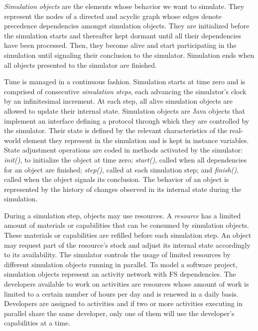 \documentclass[conference]{IEEEtran}
\begin{document}
{\it Simulation objects} are the elements whose behavior we want to simulate. They represent the nodes of a directed and acyclic graph whose edges denote precedence dependencies amongst simulation objects. They are initialized before the simulation starts and thereafter kept dormant until all their dependencies have been processed. Then, they become alive and start participating in the simulation until signaling their conclusion to the simulator. Simulation ends when all objects presented to the simulator are finished.

Time is managed in a continuous fashion. Simulation starts at time zero and is comprised of consecutive {\it simulation steps}, each advancing the simulator's clock by an infinitesimal increment. At each step, all alive simulation objects are allowed to update their internal state. Simulation objects are Java objects that implement an interface defining a protocol through which they are controlled by the simulator. Their state is defined by the relevant characteristics of the real-world element they represent in the simulation and is kept in instance variables. State adjustment operations are coded in methods activated by the simulator: {\it init()}, to initialize the object at time zero; {\it start()}, called when all dependencies for an object are finished; {\it step()}, called at each simulation step; and {\it finish()}, called when the object signals its conclusion. The behavior of an object is represented by the history of changes observed in its internal state during the simulation.

During a simulation step, objects may use resources. A {\it resource} has a limited amount of materials or capabilities that can be consumed by simulation objects. These materials or capabilities are refilled before each simulation step. An object may request part of the resource's stock and adjust its internal state accordingly to its availability. The simulator controls the usage of limited resources by different simulation objects running in parallel. To model a software project, simulation objects represent an activity network with FS dependencies. The developers available to work on activities are resources whose amount of work is limited to a certain number of hours per day and is renewed in a daily basis. Developers are assigned to activities and if two or more activities executing in parallel share the same developer, only one of them will use the developer's capabilities at a time.
\end{document}
